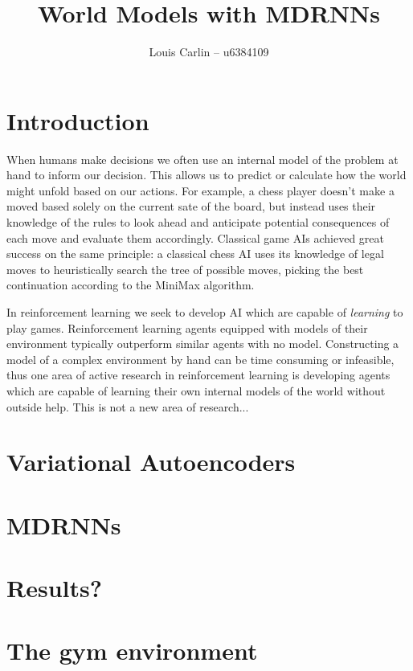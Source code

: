\documentclass{article}
\author{Louis Carlin -- u6384109}
\title{World Models with MDRNNs}
\theoremstyle{definition}
\begin{document}
\maketitle

\section{Introduction}
When humans make decisions we often use an internal model of the problem at hand to inform our decision.
This allows us to predict or calculate how the world might unfold based on our actions.
For example, a chess player doesn't make a moved based solely on the current sate of the board, but instead uses their knowledge of the rules to look ahead and anticipate potential consequences of each move and evaluate them accordingly.
Classical game AIs achieved great success on the same principle: a classical chess AI uses its knowledge of legal moves to heuristically search the tree of possible moves, picking the best continuation according to the MiniMax algorithm.

In reinforcement learning we seek to develop AI which are capable of \textit{learning} to play games.
Reinforcement learning agents equipped with models of their environment typically outperform similar agents with no model.
Constructing a model of a complex environment by hand can be time consuming or infeasible, thus one area of active research in reinforcement learning is developing agents which are capable of learning their own internal models of the world without outside help.
This is not a new area of research... %








\section{Variational Autoencoders}


\section{MDRNNs}

\section{Results?}

\section{The gym environment}

\clearpage
 
\end{document}
